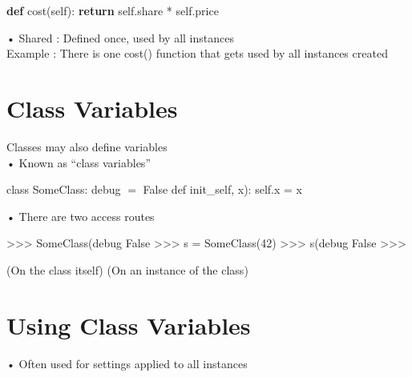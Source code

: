 \documentclass[
  letterpaper,
  DIV=11,
  numbers=noendperiod]{scrreprt}
\newenvironment{Shaded}{\begin{snugshade}}{\end{snugshade}}
\newcommand{\ControlFlowTok}[1]{\textcolor[rgb]{0.00,0.23,0.31}{\textbf{#1}}}
\newcommand{\KeywordTok}[1]{\textcolor[rgb]{0.00,0.23,0.31}{\textbf{#1}}}
\newcommand{\NormalTok}[1]{\textcolor[rgb]{0.00,0.23,0.31}{#1}}
\newcommand{\OperatorTok}[1]{\textcolor[rgb]{0.37,0.37,0.37}{#1}}
\newcommand{\VariableTok}[1]{\textcolor[rgb]{0.07,0.07,0.07}{#1}}
\begin{document}
\begin{Shaded}
\begin{Highlighting}[]
\KeywordTok{def}\NormalTok{ cost(}\VariableTok{self}\NormalTok{):}
    \ControlFlowTok{return} \VariableTok{self}\NormalTok{.share }\OperatorTok{*} \VariableTok{self}\NormalTok{.price }
\end{Highlighting}
\end{Shaded}

• Shared : Defined once, used by all instances\\
Example : There is one cost() function that gets used by all instances
created


\chapter{Class Variables}\label{class-variables}

Classes may also define variables\\
• Known as ``class variables''

class SomeClass: debug \(=\) False def init\_self, x): self.x = x

• There are two access routes

\begin{Shaded}
\begin{Highlighting}[]
\NormalTok{\textgreater{}\textgreater{}\textgreater{} SomeClass(debug  }
\NormalTok{False  }
\NormalTok{\textgreater{}\textgreater{}\textgreater{} s = SomeClass(42)  }
\NormalTok{\textgreater{}\textgreater{}\textgreater{} s(debug  }
\NormalTok{False  }
\NormalTok{\textgreater{}\textgreater{}\textgreater{} }
\end{Highlighting}
\end{Shaded}

\begin{Shaded}
\begin{Highlighting}[]
\NormalTok{(On the class itself) (On an instance of the class) }
\end{Highlighting}
\end{Shaded}


\chapter{Using Class Variables}\label{using-class-variables}

• Often used for settings applied to all instances
\end{document}
